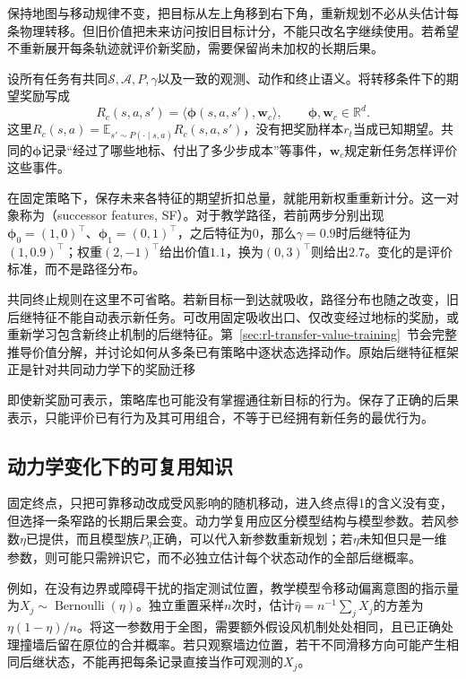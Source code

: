 保持地图与移动规律不变，把目标从左上角移到右下角，重新规划不必从头估计每条物理转移。但旧价值把未来访问按旧目标计分，不能只改名字继续使用。若希望不重新展开每条轨迹就评价新奖励，需要保留尚未加权的长期后果。

设所有任务有共同$\mathcal S,\mathcal A,P,\gamma$以及一致的观测、动作和终止语义。将转移条件下的期望奖励写成
\begin{equation}
  R_c(s,a,s')=\langle\bm\phi(s,a,s'),\bm w_c\rangle,
  \qquad \bm\phi,\bm w_c\in\mathbb R^d.
  \label{eq:rl-transfer-linear-reward}
\end{equation}
这里$R_c(s,a)=\mathbb E_{s'\sim P(\cdot\mid s,a)}R_c(s,a,s')$，没有把奖励样本$r_t$当成已知期望。共同的$\bm\phi$记录“经过了哪些地标、付出了多少步成本”等事件，$\bm w_c$规定新任务怎样评价这些事件。

在固定策略下，保存未来各特征的期望折扣总量，就能用新权重重新计分。这一对象称为（successor features, SF）。对于教学路径，若前两步分别出现$\bm\phi_0=(1,0)^\top$、$\bm\phi_1=(0,1)^\top$，之后特征为0，那么$\gamma=0.9$时后继特征为$(1,0.9)^\top$；权重$(2,-1)^\top$给出价值$1.1$，换为$(0,3)^\top$则给出$2.7$。变化的是评价标准，而不是路径分布。

共同终止规则在这里不可省略。若新目标一到达就吸收，路径分布也随之改变，旧后继特征不能自动表示新任务。可改用固定吸收出口、仅改变经过地标的奖励，或重新学习包含新终止机制的后继特征。第~\ref{sec:rl-transfer-value-training}~节会完整推导价值分解，并讨论如何从多条已有策略中逐状态选择动作。原始后继特征框架正是针对共同动力学下的奖励迁移

即使新奖励可表示，策略库也可能没有掌握通往新目标的行为。保存了正确的后果表示，只能评价已有行为及其可用组合，不等于已经拥有新任务的最优行为。

\subsection{动力学变化下的可复用知识}
\label{sec:rl-transfer-dynamics-change}

固定终点，只把可靠移动改成受风影响的随机移动，进入终点得1的含义没有变，但选择一条窄路的长期后果会变。动力学复用应区分模型结构与模型参数。若风参数$\eta$已提供，而且模型族$P_\eta$正确，可以代入新参数重新规划；若$\eta$未知但只是一维参数，则可能只需辨识它，而不必独立估计每个状态动作的全部后继概率。

例如，在没有边界或障碍干扰的指定测试位置，教学模型令移动偏离意图的指示量为$X_j\sim\operatorname{Bernoulli}(\eta)$。独立重置采样$n$次时，估计$\widehat\eta=n^{-1}\sum_jX_j$的方差为$\eta(1-\eta)/n$。将这一参数用于全图，需要额外假设风机制处处相同，且已正确处理撞墙后留在原位的合并概率。若只观察墙边位置，若干不同滑移方向可能产生相同后继状态，不能再把每条记录直接当作可观测的$X_j$。

